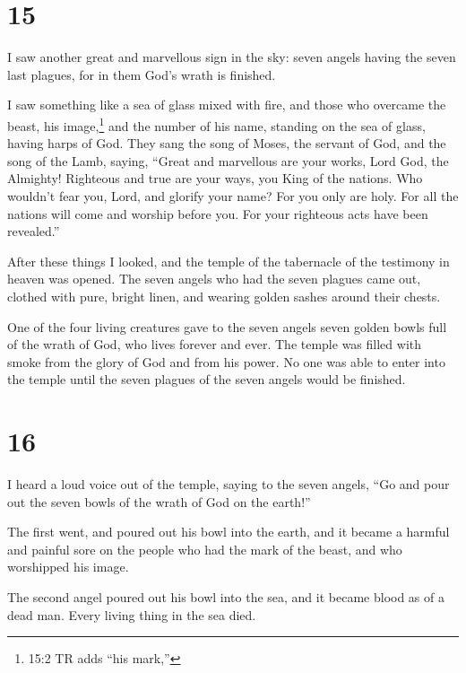 \hypertarget{section-14}{%
\section{15}\label{section-14}}

 I saw another great and marvellous sign in the sky: seven
angels having the seven last plagues, for in them God's wrath is
finished.

 I saw something like a sea of glass mixed with fire, and
those who overcame the beast, his image,\footnote{15:2 TR adds ``his
  mark,''} and the number of his name, standing on the sea of glass,
having harps of God.  They sang the song of Moses, the
servant of God, and the song of the Lamb, saying, ``Great and marvellous
are your works, Lord God, the Almighty! Righteous and true are your
ways, you King of the nations.  Who wouldn't fear you, Lord,
and glorify your name? For you only are holy. For all the nations will
come and worship before you. For your righteous acts have been
revealed.''

 After these things I looked, and the temple of the
tabernacle of the testimony in heaven was opened.  The seven
angels who had the seven plagues came out, clothed with pure, bright
linen, and wearing golden sashes around their chests.

 One of the four living creatures gave to the seven angels
seven golden bowls full of the wrath of God, who lives forever and ever.
 The temple was filled with smoke from the glory of God and
from his power. No one was able to enter into the temple until the seven
plagues of the seven angels would be finished.

\hypertarget{section-15}{%
\section{16}\label{section-15}}

 I heard a loud voice out of the temple, saying to the seven
angels, ``Go and pour out the seven bowls of the wrath of God on the
earth!''

 The first went, and poured out his bowl into the earth, and
it became a harmful and painful sore on the people who had the mark of
the beast, and who worshipped his image.

 The second angel poured out his bowl into the sea, and it
became blood as of a dead man. Every living thing in the sea died.

